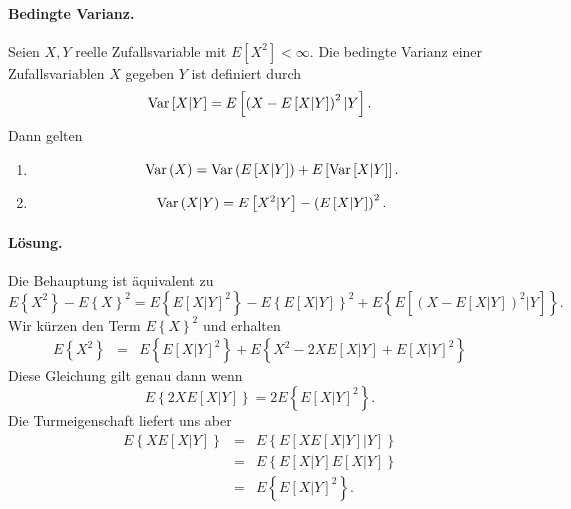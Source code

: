 \paragraph{Bedingte Varianz. } Seien $X,Y$ reelle Zufallsvariable mit $E\left[
X^2 \right] <\infty$.  Die bedingte Varianz einer Zufallsvariablen $X$ gegeben
$Y$ ist definiert durch
\begin{equation*}
	\operatorname{Var} \left[ X|Y \right] = E \left[ \left( X - E\left[ X|Y \right] \right)^2|Y \right].
\end{equation*}
Dann gelten
\begin{enumerate}
    \item 
        \begin{equation*}
        \operatorname{Var} \left( X \right) = 
        \operatorname{Var} \left( E\left[ X|Y \right] \right) + E \left[ \operatorname{Var}\left[ X|Y \right] \right].
        \end{equation*}
    \item \begin{equation*}
            \operatorname{Var} \left( X | Y \right) = E \left[ X^2 | Y \right] 
            - \left( E\left[ X | Y \right] \right)^2.
        \end{equation*}
\end{enumerate}

\paragraph*{Lösung. } 
Die Behauptung ist äquivalent zu 
\begin{equation*}
    E\left\{ X^2 \right\} - E\left\{ X \right\}^2 
    = E\left\{ E\left[ X|Y \right]^2 \right\} - E\left\{ E\left[ X|Y \right] \right\}^2
    + E\left\{ E\left[ \left( X - E\left[ X|Y \right] \right)^2 |Y \right] \right\}.
\end{equation*}
Wir kürzen den Term $E\left\{ X \right\}^2$ und erhalten 
\begin{eqnarray*}
    E\left\{ X^2 \right\}&=& 
    E\left\{ E\left[ X|Y \right]^2 \right\} +
    E\left\{ X^2 - 2X E\left[ X|Y \right] + E\left[ X|Y \right]^2 \right\}
\end{eqnarray*}
Diese Gleichung gilt genau dann wenn
\begin{equation*}
    E\left\{  2X E\left[ X|Y \right] \right\} = 2 E\left\{ E\left[ X|Y \right]^2 \right\}.	
\end{equation*}
Die Turmeigenschaft liefert uns aber
\begin{eqnarray*}
    E\left\{  X E\left[ X|Y \right] \right\} &=& 
    E\left\{ E\left[ X E\left[ X|Y \right] | Y \right] \right\} \\
    &=& E\left\{ E\left[ X|Y \right] E\left[ X|Y \right]   \right\} \\
    &=& E\left\{ E\left[ X|Y \right]^2 \right\}.
\end{eqnarray*}


